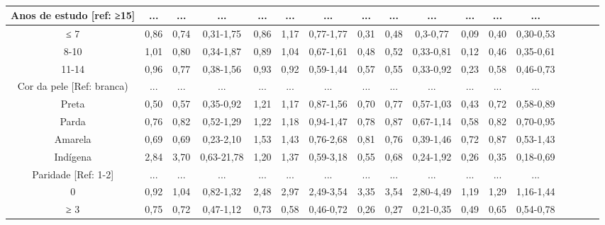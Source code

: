 \documentclass{article}
\begin{document}
\begin{table}
\begin{tabulary}{\linewidth}{ C C C C C C C C C C C C C C C C C }
Anos de estudo [ref: ≥15]
& ...
& ...
& ...
& ...
& ...
& ...
& ...
& ...
& ...
& ...
& ...
& ...
\\ \hline

≤ 7
& 0,86
& 0,74
& 0,31-1,75
& 0,86
& 1,17
& 0,77-1,77
& 0,31
& 0,48
& 0,3-0,77
& 0,09
& 0,40
& 0,30-0,53
\\ \hline

8-10
& 1,01
& 0,80
& 0,34-1,87
& 0,89
& 1,04
& 0,67-1,61
& 0,48
& 0,52
& 0,33-0,81
& 0,12
& 0,46
& 0,35-0,61
\\ \hline

11-14
& 0,96
& 0,77
& 0,38-1,56
& 0,93
& 0,92
& 0,59-1,44
& 0,57
& 0,55
& 0,33-0,92
& 0,23
& 0,58
& 0,46-0,73
\\ \hline

Cor da pele [Ref: branca)
& ...
& ...
& ...
& ...
& ...
& ...
& ...
& ...
& ...
& ...
& ...
& ...
\\ \hline

Preta
& 0,50
& 0,57
& 0,35-0,92
& 1,21
& 1,17
& 0,87-1,56
& 0,70
& 0,77
& 0,57-1,03
& 0,43
& 0,72
& 0,58-0,89
\\ \hline

Parda
& 0,76
& 0,82
& 0,52-1,29
& 1,22
& 1,18
& 0,94-1,47
& 0,78
& 0,87
& 0,67-1,14
& 0,58
& 0,82
& 0,70-0,95
\\ \hline

Amarela
& 0,69
& 0,69
& 0,23-2,10
& 1,53
& 1,43
& 0,76-2,68
& 0,81
& 0,76
& 0,39-1,46
& 0,72
& 0,87
& 0,53-1,43
\\ \hline

Indígena
& 2,84
& 3,70
& 0,63-21,78
& 1,20
& 1,37
& 0,59-3,18
& 0,55
& 0,68
& 0,24-1,92
& 0,26
& 0,35
& 0,18-0,69
\\ \hline

Paridade [Ref: 1-2]
& ...
& ...
& ...
& ...
& ...
& ...
& ...
& ...
& ...
& ...
& ...
& ...
\\ \hline

0
& 0,92
& 1,04
& 0,82-1,32
& 2,48
& 2,97
& 2,49-3,54
& 3,35
& 3,54
& 2,80-4,49
& 1,19
& 1,29
& 1,16-1,44
\\ \hline

≥ 3
& 0,75
& 0,72
& 0,47-1,12
& 0,73
& 0,58
& 0,46-0,72
& 0,26
& 0,27
& 0,21-0,35
& 0,49
& 0,65
& 0,54-0,78
\\ \hline

\end{tabulary}
\caption*{\footnotesize }
\caption{}
\end{table}
\end{document}
